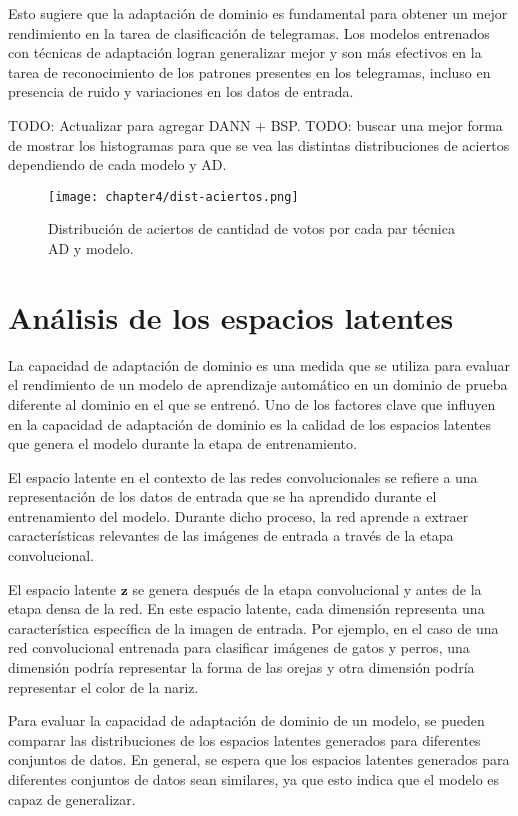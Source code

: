 Esto sugiere que la adaptación de dominio es fundamental para obtener un mejor rendimiento en la tarea de clasificación
de telegramas. Los modelos entrenados con técnicas de adaptación logran generalizar mejor y son más efectivos en la
tarea de reconocimiento de los patrones presentes en los telegramas, incluso en presencia de ruido y variaciones en los
datos de entrada.

TODO: Actualizar para agregar DANN + BSP. TODO: buscar una mejor forma de mostrar los histogramas para que se vea las
distintas distribuciones de aciertos dependiendo de cada modelo y AD.
\begin{figure}[H]
    \centering
    \texttt{[image: chapter4/dist-aciertos.png]}
    \caption{Distribución de aciertos de cantidad de votos por cada par técnica AD y modelo.}
    \label{fig:distribucion-aciertos}
\end{figure}

\section{Análisis de los espacios latentes}

La capacidad de adaptación de dominio es una medida que se utiliza para evaluar el rendimiento de un modelo de
aprendizaje automático en un dominio de prueba diferente al dominio en el que se entrenó. Uno de los factores clave que
influyen en la capacidad de adaptación de dominio es la calidad de los espacios latentes que genera el modelo durante
la etapa de entrenamiento.

El espacio latente en el contexto de las redes convolucionales se refiere a una representación de los datos de entrada
que se ha aprendido durante el entrenamiento del modelo. Durante dicho proceso, la red aprende a extraer
características relevantes de las imágenes de entrada a través de la etapa convolucional.

El espacio latente $\mathbf{z}$ se genera después de la etapa convolucional y antes de la etapa densa de la red. En
este espacio latente, cada dimensión representa una característica específica de la imagen de entrada. Por ejemplo, en
el caso de una red convolucional entrenada para clasificar imágenes de gatos y perros, una dimensión podría representar
la forma de las orejas y otra dimensión podría representar el color de la nariz.

Para evaluar la capacidad de adaptación de dominio de un modelo, se pueden comparar las distribuciones de los espacios
latentes generados para diferentes conjuntos de datos. En general, se espera que los espacios latentes generados para
diferentes conjuntos de datos sean similares, ya que esto indica que el modelo es capaz de generalizar.

